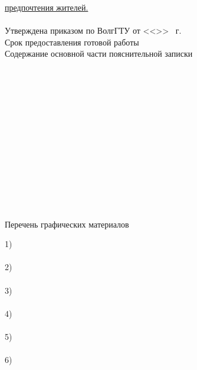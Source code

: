 \begin{titlepage}
    \vspace{0.5em}\hspace*{12mm}\underline{предпочтения жителей.\hspace{21.2em}}\\
    \vspace{0.5em}\hspace*{12mm}\underline{\hspace{0.93\textwidth}}\\
    \vspace{1em}Утверждена приказом по ВолгГТУ от <<\LINE{1em}>> \underline{\hspace{4em}}
        \the\year\ г. \textnumero \LINE{7em}\\
    Срок предоставления готовой работы \\
    Содержание основной части пояснительной записки\\
    \LINE{\textwidth}\\\LINE{\textwidth}\\\LINE{\textwidth}\\\LINE{\textwidth}\\\LINE{\textwidth}\\
    \LINE{\textwidth}\\\LINE{\textwidth}\\\LINE{\textwidth}\\\LINE{\textwidth}\\\LINE{\textwidth}\\
    \LINE{\textwidth}\\\LINE{\textwidth}\\\LINE{\textwidth}\\
    \newpage
    \thispagestyle{empty}
    \begin{center}
        Перечень графических материалов
    \end{center}
    1) \\\LINE{\textwidth}\\
    2) \\\LINE{\textwidth}\\
    3) \\\LINE{\textwidth}\\
    4) \\\LINE{\textwidth}\\
    5) \\\LINE{\textwidth}\\
    6) \\\LINE{\textwidth}\\

\end{titlepage}
